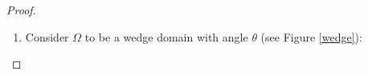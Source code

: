 \begin{proof}
\begin{enumerate}

    \item Consider \(\Omega\) to be a wedge domain with angle \(\theta\) (see Figure \ref*{wedge}):
    
    \begin{figure}[H]
    \centering
\end{figure}
\end{enumerate}
\end{proof}
